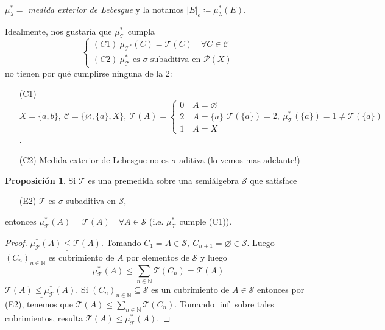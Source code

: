 \documentclass[11pt]{article}
\theoremstyle{definition} %
\newtheorem{proposition}[theorem]{Proposición}
\newcommand{\N}{\mathbb{N}}
\begin{document}
\begin{property}
\begin{eg}
	$\mu_{\lambda}^{*} =$ \textit{medida exterior de Lebesgue} y la notamos $|E|_e \coloneq \mu_{\lambda}^{*}(E)$.
\end{eg}

Idealmente, nos gustaría que $\mu_{\mathcal{T}}^{*}$ cumpla
\[ \begin{cases}
	(C1) \ \mu_{\mathcal{T}^{*}}(C) = \mathcal{T}(C) \quad \forall C \in \mathscr{C} \\
	(C2) \ \mu_{\mathcal{T}}^{*} \text{ es } \sigma\text{-subaditiva en } \mathscr{P}(X)
\end{cases} \]
no tienen por qué cumplirse ninguna de la 2:
\begin{enumerate}
	\item[(C1)] $X = \{a,b\},\ \mathscr{C} = \{\varnothing, \{a\}, X\},\ \mathcal{T}(A) = \begin{cases}
		0 \quad A = \varnothing \\
		2 \quad A = \{a\} \\
		1 \quad A = X
	\end{cases} \mathcal{T}(\{a\}) = 2,\ \mu_{\mathcal{T}}^{*}(\{a\}) = 1 \neq \mathcal{T}(\{a\})$.

	\item[(C2)] Medida exterior de Lebesgue no es $\sigma$-aditiva (lo vemos mas adelante!)
\end{enumerate}

\begin{proposition}
	Si $\mathcal{T}$ es una premedida sobre una semiálgebra $\mathscr{S}$ que satisface
	\begin{enumerate}
		\item[(E2)] $\mathcal{T}$ es $\sigma$-subaditiva en $\mathscr{S}$,
	\end{enumerate}
	entonces $\mu_{\mathcal{T}}^{*}(A) = \mathcal{T}(A)\quad \forall A \in \mathscr{S}$ (i.e. $\mu_{\mathcal{T}}^{*}$ cumple (C1)).
\end{proposition}
\begin{proof}
	$\underline{\mu_{\mathcal{T}}^{*}(A) \leq \mathcal{T}(A).}$ Tomando $C_1 = A \in \mathscr{S},\ C_{n+1} = \varnothing \in \mathscr{S}$. Luego $(C_n)_{n\in\N}$ es cubrimiento de $A$ por elementos de $\mathscr{S}$ y luego
	\[ \mu_{\mathcal{T}}^{*}(A) \leq \sum_{n\in\N} \mathcal{T}(C_n) = \mathcal{T}(A) \]
	$\underline{\mathcal{T}(A) \leq \mu_{\mathcal{T}}^{*}(A).}$ Si $(C_n)_{n\in\N}\subseteq \mathscr{S}$ es un cubrimiento de $A \in \mathscr{S}$ entonces por (E2), tenemos que $\mathcal{T}(A) \leq \sum_{n\in\N} \mathcal{T}(C_n)$. Tomando $\inf$ sobre tales cubrimientos, resulta $\mathcal{T}(A) \leq \mu_{\mathcal{T}}^{*}(A)$.
\end{proof}


\end{property}
\end{document}
